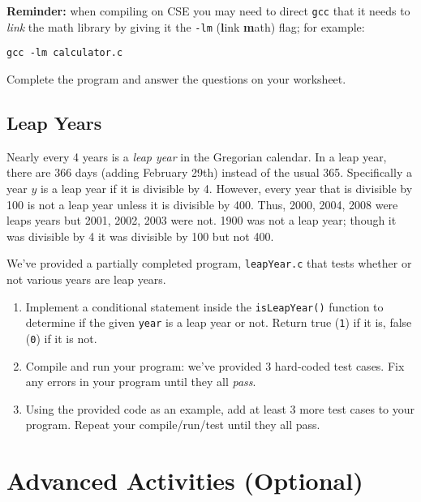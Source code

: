 \documentclass[12pt]{scrartcl}
\begin{document}
\textbf{Reminder:} when compiling on CSE you may need to direct \texttt{gcc}
that it needs to \emph{link} the math library by giving it the \texttt{-lm} 
(\textbf{l}ink \textbf{m}ath) flag; for example:

\texttt{gcc -lm calculator.c}

Complete the program and answer the questions on your worksheet.

\subsection{Leap Years}

Nearly every 4 years is a \emph{leap year} in the Gregorian calendar.
In a leap year, there are 366 days (adding February 29th) instead of the
usual 365.  Specifically a year $y$ is a leap year if it is divisible
by 4.  However, every year that is divisible by 100 is not a leap year 
unless it is divisible by 400.  Thus, 2000, 2004, 2008 were leaps years
but 2001, 2002, 2003 were not.  1900 was not a leap year; though it was
divisible by 4 it was divisible by 100 but not 400.

We've provided a partially completed program, \texttt{leapYear.c}
that tests whether or not various years are leap years.  

\begin{enumerate}
  \item Implement a conditional statement inside the 
  \texttt{isLeapYear()} function to determine if the given
  \texttt{year} is a leap year or not.  Return true (\texttt{1})
  if it is, false (\texttt{0}) if it is not.
  \item Compile and run your program: we've provided 3 
  hard-coded test cases.  Fix any errors in your program until they all 
  \emph{pass}.  
  \item Using the provided code as an example, add at least 3 more
  test cases to your program.  Repeat your compile/run/test until they
  all pass.
\end{enumerate}


\section{Advanced Activities (Optional)}
\end{document}
